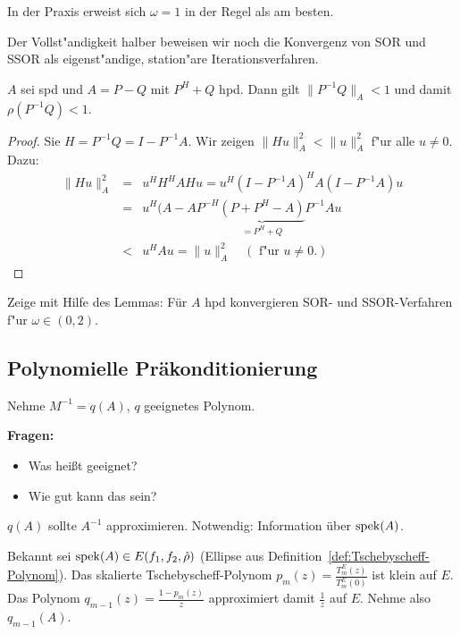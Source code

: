 In der Praxis erweist sich $\omega = 1$ in der Regel als am besten.
\medskip

Der Vollst"andigkeit halber beweisen wir noch die Konvergenz von SOR und SSOR als eigenst"andige, station"are Iterationsverfahren.

\begin{lem} $A$ sei spd und $A=P-Q$ mit $P^H+Q$ hpd. Dann gilt $\|P^{-1}Q\|_A < 1$ und damit $\rho(P^{-1}Q) <1 $.
\end{lem}
\begin{proof} Sie $H = P^{-1}Q = I - P^{-1}A$. Wir zeigen $\|Hu\|_A^2 < \|u\|_A^2$ f"ur alle $u \neq 0$. \\
Dazu:
\begin{eqnarray*}
\|Hu\|_A^2 &=& u^HH^HAHu = u^H(I-P^{-1}A)^H A (I-P^{-1}A)u \\
           &=& u^H(A - AP^{-H}\underbrace{(P+P^H-A)}_{=P^H+Q}P^{-1}A u \\
           & < & u^HAu = \|u\|_A^2  \quad(\text{ f"ur } u \neq 0.)
\end{eqnarray*}
\end{proof}

\begin{aufg} Zeige mit Hilfe des Lemmas: F\"ur $A$ hpd konvergieren SOR- und SSOR-Verfahren f"ur $\omega \in (0,2)$.
\end{aufg}


\subsection{Polynomielle Pr\"akonditionierung}

Nehme $M^{-1} = q(A)$, $q$ geeignetes Polynom. \medskip

\textbf{Fragen:}
\begin{itemize}
\item Was hei\ss{}t geeignet?
\item Wie gut kann das sein?
\end{itemize}

$q(A)$ sollte $A^{-1}$ approximieren. Notwendig: Information \"uber $ \operatorname{spek}(A)$.



\begin{bsp} Bekannt sei $\operatorname{spek}(A) \in E(f_1,f_2,\hat{\rho})$ (Ellipse aus Definition~\ref{def:Tschebyscheff-Polynom}). Das skalierte Tschebyscheff-Polynom $ p_m(z)=\frac{T_m^E(z)}{T_m^E(0)}$ ist klein auf $E$. Das Polynom  $q_{m-1}(z) = \frac{1-p_m(z)}{z}$ approximiert damit $\frac{1}{z}$ auf $E$. Nehme also $q_{m-1}(A)$.
\end{bsp}

